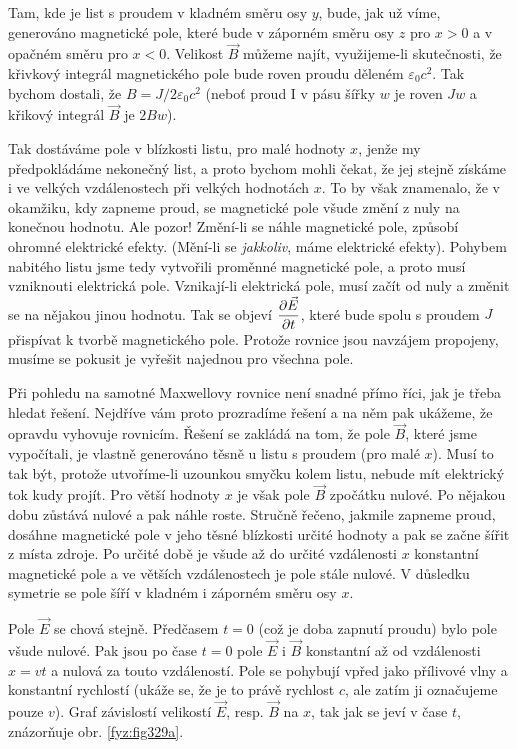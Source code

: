   Tam, kde je list s proudem v kladném směru osy \(y\), bude, jak už víme, generováno magnetické 
  pole, které bude v záporném směru osy \(z\) pro \(x>0\) a v opačném směru pro \(x<0\). Velikost 
  \(\vec{B}\) můžeme najít, využijeme-li skutečnosti, že křivkový integrál magnetického pole bude 
  roven proudu děleném \(\varepsilon_0c^2\). Tak bychom dostali, že \(B=J/2\varepsilon_0c^2\) 
  (neboť proud I v pásu šířky \(w\) je roven \(Jw\) a křikový integrál \(\vec{B}\) je \(2Bw\)).
  
  Tak dostáváme pole v blízkosti listu, pro malé hodnoty \(x\), jenže my předpokládáme nekonečný 
  list, a proto bychom mohli čekat, že jej stejně získáme i ve velkých vzdálenostech při velkých 
  hodnotách \(x\). To by však znamenalo, že v okamžiku, kdy zapneme proud, se magnetické pole všude 
  změní z nuly na konečnou hodnotu. Ale pozor! Změní-li se náhle magnetické pole, způsobí ohromné 
  elektrické efekty. (Mění-li se \emph{jakkoliv}, máme elektrické efekty). Pohybem nabitého listu 
  jsme tedy vytvořili proměnné magnetické pole, a proto musí vzniknouti elektrická pole. 
  Vznikají-li elektrická pole, musí začít od nuly a změnit se na nějakou jinou hodnotu. Tak se 
  objeví \(\dfrac{\partial \vec{E}}{\partial t}\), které bude spolu s proudem \(J\) přispívat k tvorbě magnetického 
  pole. Protože rovnice jsou navzájem propojeny, musíme se pokusit je vyřešit najednou pro všechna 
  pole.
  
  Při pohledu na samotné Maxwellovy rovnice není snadné přímo říci, jak je třeba hledat řešení. 
  Nejdříve vám proto prozradíme řešení a na něm pak ukážeme, že opravdu vyhovuje rovnicím. Řešení 
  se zakládá na tom, že pole \(\vec{B}\), které jsme vypočítali, je vlastně generováno těsně u 
  listu s proudem (pro malé \(x\)). Musí to tak být, protože utvoříme-li uzounkou smyčku kolem 
  listu, nebude mít elektrický tok kudy projít. Pro větší hodnoty \(x\) je však pole \(\vec{B}\) 
  zpočátku nulové. Po nějakou dobu zůstává nulové a pak náhle roste. Stručně řečeno, jakmile 
  zapneme proud, dosáhne magnetické pole v jeho těsné blízkosti určité hodnoty a pak se začne šířit 
  z místa zdroje. Po určité době je všude až do určité vzdálenosti \(x\) konstantní magnetické pole 
  a ve větších vzdálenostech je pole stále nulové. V důsledku symetrie se pole šíří v kladném i 
  záporném směru osy \(x\).
 
  Pole \(\vec{E}\) se chová stejně. Předčasem \(t = 0\) (což je doba zapnutí proudu) bylo pole 
  všude nulové. Pak jsou po čase \(t=0\) pole \(\vec{E}\) i \(\vec{B}\) konstantní až od 
  vzdálenosti \(x = vt\) a nulová za touto vzdáleností. Pole se pohybují vpřed jako přílivové vlny 
  a konstantní rychlostí (ukáže se, že je to právě rychlost \(c\), ale zatím ji označujeme pouze 
  \(v\)). Graf závislostí velikostí \(\vec{E}\), resp. \(\vec{B}\) na \(x\), tak jak se jeví v 
  čase \(t\), znázorňuje obr. \ref{fyz:fig329a}.
  
